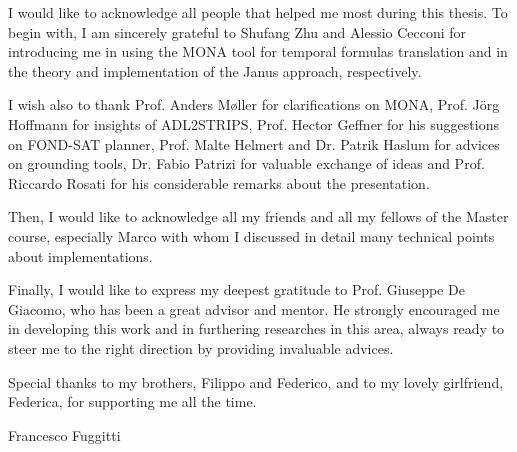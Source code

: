 \documentclass[english, LaM, oneside]{sapthesis}%
\theoremstyle{plain}
\theoremstyle{definition}
\begin{document}
\dedication{To my parents and grandparents}
%	
\begin{acknowledgments}
I would like to acknowledge all people that helped me most during this thesis. To begin with, I am sincerely grateful to Shufang Zhu and Alessio Cecconi for introducing me in using the MONA tool for temporal formulas translation and in the theory and implementation of the Janus approach, respectively. 

I wish also to thank Prof. Anders M{\o}ller for clarifications on MONA, Prof. Jörg Hoffmann for insights of ADL2STRIPS, Prof. Hector Geffner for his suggestions on FOND-SAT planner, Prof. Malte Helmert and Dr. Patrik Haslum for advices on grounding tools, Dr. Fabio Patrizi for valuable exchange of ideas and Prof. Riccardo Rosati for his considerable remarks about the presentation.
 
Then, I would like to acknowledge all my friends and all my fellows of the Master course, especially Marco with whom I discussed in detail many technical points about implementations.


Finally, I would like to express my deepest gratitude to Prof. Giuseppe De Giacomo, who has been
a great advisor and mentor. He strongly encouraged me in developing this work and in furthering researches in this area, always ready to steer me to the right direction by providing invaluable advices.

\bigskip
Special thanks to my brothers, Filippo and Federico, and to my lovely girlfriend, Federica, for supporting me all the time.

\begin{flushright}
Francesco Fuggitti
\end{flushright}
\end{acknowledgments}
	
	\tableofcontents
	
	\mainmatter
	
	
	
	
	
	
	
%	
%	

	
	\backmatter
	
	
	
\end{document}
